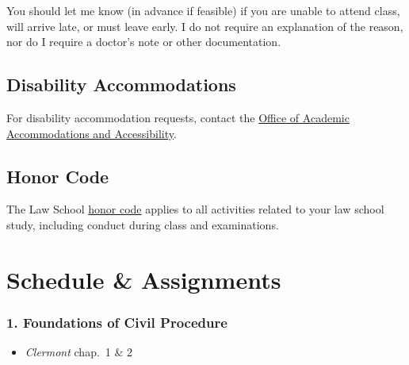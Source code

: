 \documentclass[11pt,letterpaper,twoside]{article}
\providecommand{\tightlist}{%
\setlength{\itemsep}{0em}\setlength{\parskip}{0em}\setlength{\itemindent}{0em}}
\begin{document}
You should let me know (in advance if feasible) if you are unable to
attend class, will arrive late, or must leave early. I do not require an
explanation of the reason, nor do I require a doctor's note or other
documentation.

\section*{Disability Accommodations}\label{disability-accommodations}


For disability accommodation requests, contact the
\href{https://www.elon.edu/u/academics/koenigsberger-learning-center/disabilities-resources/homepage/graduate-student-resources/}{Office
of Academic Accommodations and Accessibility}.

\section*{Honor Code}\label{honor-code}


The Law School
\href{https://www.elon.edu/u/law/students/honor-code/}{honor code}
applies to all activities related to your law school study, including
conduct during class and examinations.


\chapter*{Schedule \& Assignments}\label{schedule-assignments}


\subsection*{1. Foundations of Civil
Procedure}\label{foundations-of-civil-procedure}

\begin{itemize}
\tightlist
\item
  \emph{Clermont} chap.~1 \& 2
\end{itemize}
\end{document}
